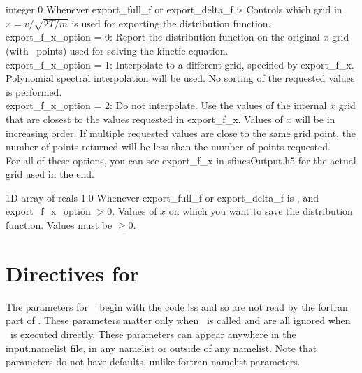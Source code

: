 {integer}
{0}
{Whenever {\ttfamily export\_full\_f} or {\ttfamily export\_delta\_f} is \true}
{Controls which grid in $x = v/\sqrt{2T/m}$ is used for exporting the distribution function.\\

{\ttfamily export\_f\_x\_option} = 0: Report the distribution function on the original $x$ grid (with \Nx~points) used for solving the kinetic equation.\\

{\ttfamily export\_f\_x\_option} = 1: Interpolate to a different grid, specified by {\ttfamily export\_f\_x}.  Polynomial spectral interpolation will be used.
  No sorting of the requested values is performed.\\

{\ttfamily export\_f\_x\_option} = 2: Do not interpolate. Use the values of the internal $x$ grid that are closest to the values requested in {\ttfamily export\_f\_x}.
  Values of $x$ will be in increasing order. If multiple requested values are close to the same grid point, the number of
  points returned will be less than the number of points requested.\\

For all of these options, you can see {\ttfamily export\_f\_x} in {\ttfamily sfincsOutput.h5} for the actual grid used in the end.
}

\myhrule

{1D array of reals}
{1.0}
{Whenever {\ttfamily export\_full\_f} or {\ttfamily export\_delta\_f} is \true, and {\ttfamily export\_f\_x\_option} $>0$.}
{Values of $x$ on which you want to save the distribution function.  Values must be $\ge 0$.}




















\section{Directives for \sfincsScan}
\label{sec:sfincsScanParams}

The parameters for \sfincsScan~ begin with the code {\ttfamily !ss} and so are not read by the fortran part of \sfincs.
These parameters matter only when \sfincsScan~is called and are all ignored when \sfincs~is executed directly.
These parameters can appear anywhere in the {\ttfamily input.namelist} file, in any namelist or outside of any namelist.
Note that \sfincsScan~ parameters do not have defaults, unlike fortran namelist parameters.\\

